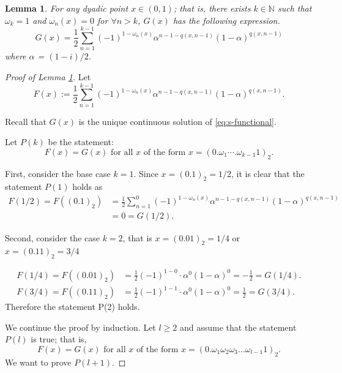 \documentclass[10pt,a4paper]{amsart}
\newtheorem{lemma}{Lemma}
\begin{document}
\begin{lemma}
\label{th:shiftedlevyexplicit}
For any dyadic point $x \in (0,1)$; that is, there exists $k\in \mathbb{N}$ such that $\omega_k=1$ and $\omega_n(x)=0$ for $\forall n> k$, $G(x)$ has the following expression. 
\begin{equation}
    \label{explicts-levy}
    G(x) = \frac{1}{2}\sum_{n=1}^{k-1}(-1)^{1-\omega_n(x)}\alpha^{n-1-q(x,n-1)}(1-\alpha)^{q(x,n-1)}
\end{equation}
where $\alpha$ = $(1-i)/2$.
\end{lemma} 

\begin{proof}[Proof of Lemma \ref{th:shiftedlevyexplicit}]

Let 
\begin{equation*}
F(x) := \frac{1}{2}\sum_{n=1}^{k-1}(-1)^{1-\omega_n(x)}\alpha^{n-1-q(x,n-1)}(1-\alpha)^{q(x,n-1)}.
\end{equation*}

Recall that $G(x)$ is the unique continuous solution of \eqref{eq:s-functional}.

Let $P(k)$ be the statement: 
$$F(x)=G(x) \mbox{ for all } x \mbox{ of the form } x=(0.\omega_1 \cdots .\omega_{k-1} 1)_{2}.$$

First, consider the base case $k=1$. Since $x=(0.1)_{2}=1/2$, it is clear that the statement $P(1)$ holds as  
\begin{align*}
F(1/2)=F((0.1)_{2}) &= \frac{1}{2}\sum_{n=1}^{0}(-1)^{1- \omega_n(x)}\alpha^{n-1-q(x,n-1)}(1-\alpha)^{q(x,n-1)}\\
& = 0 =G(1/2). 
\end{align*}

Second, consider the case $k=2$, that is $x=(0.01)_2=1/4$ or $x=(0.11)_2= 3/4$

\begin{align*}
F(1/4)=F((0.01)_{2}) &= \frac{1}{2}(-1)^{1-0}\cdot \alpha^0(1-\alpha)^0 =-\frac{1}{2} =G(1/4). \\
F(3/4)=F((0.11)_{2}) &= \frac{1}{2}(-1)^{1-1}\cdot \alpha^0(1-\alpha)^0 =\frac{1}{2} =G(3/4). 
\end{align*}
Therefore the statement P(2) holds.

We continue the proof by induction. Let $l \geq 2$ and assume that the statement $P(l)$ is true; that is,  
$$F(x) = G(x) \mbox { for all } x \mbox{ of the form } x=(0.\omega_1\omega_2\omega_3 \dots \omega_{l-1}1)_2.$$ 
We want to prove $P(l+1)$.

\medskip


\end{proof}
\end{document}
